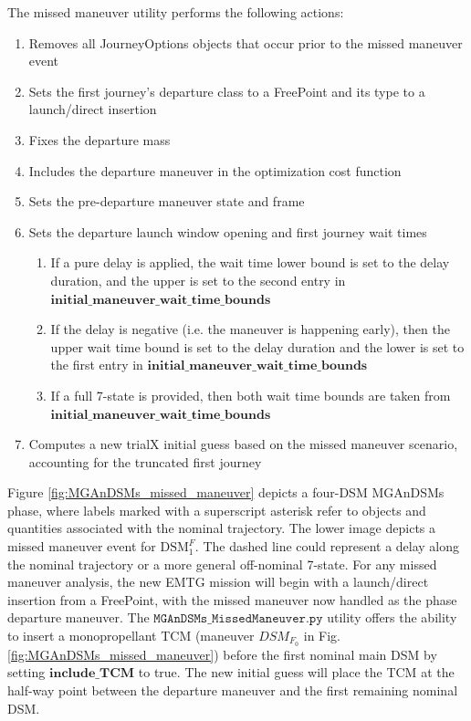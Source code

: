 \documentclass[11pt]{article}
\begin{document}
The missed maneuver utility performs the following actions:

\begin{enumerate}
	\item Removes all JourneyOptions objects that occur prior to the missed maneuver event
	\item Sets the first journey's departure class to a FreePoint and its type to a launch/direct insertion
	\item Fixes the departure mass
	\item Includes the departure maneuver in the optimization cost function
	\item Sets the pre-departure maneuver state and frame
	\item Sets the departure launch window opening and first journey wait times
		\begin{enumerate}
			\item If a pure delay is applied, the wait time lower bound is set to the delay duration, and the upper is set to the second entry in $\mathtt{\mathbf{initial\_maneuver\_wait\_time\_bounds}}$
			\item If the delay is negative (i.e. the maneuver is happening early), then the upper wait time bound is set to the delay duration and the lower is set to the first entry in $\mathtt{\mathbf{initial\_maneuver\_wait\_time\_bounds}}$
			\item If a full 7-state is provided, then both wait time bounds are taken from $\mathtt{\mathbf{initial\_maneuver\_wait\_time\_bounds}}$
		\end{enumerate}
	\item Computes a new trialX initial guess based on the missed maneuver scenario, accounting for the truncated first journey
\end{enumerate}

Figure \ref{fig:MGAnDSMs_missed_maneuver} depicts a four-\ac{DSM} MGAnDSMs phase, where labels marked with a superscript asterisk refer to objects and quantities associated with the nominal trajectory. The lower image depicts a missed maneuver event for $\text{DSM}^F_1$. The dashed line could represent a delay along the nominal trajectory or a more general off-nominal 7-state. For any missed maneuver analysis, the new EMTG mission will begin with a launch/direct insertion from a FreePoint, with the missed maneuver now handled as the phase departure maneuver. The $\mathtt{MGAnDSMs\_MissedManeuver.py}$ utility offers the ability to insert a monopropellant \ac{TCM} (maneuver $DSM_{F_0}$ in Fig. \ref{fig:MGAnDSMs_missed_maneuver}) before the first nominal main \ac{DSM} by setting $\mathtt{\mathbf{include\_TCM}}$ to true. The new initial guess will place the \ac{TCM} at the half-way point between the departure maneuver and the first remaining nominal \ac{DSM}.
\end{document}
